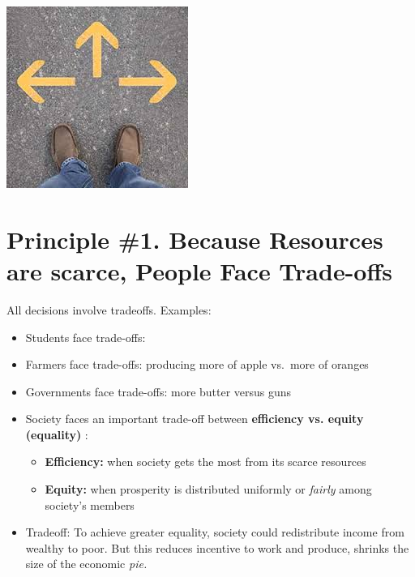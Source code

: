 \documentclass[
]{book}
\begin{document}
\includegraphics[width=\textwidth,height=0.6\textheight]{images/lesson01/fig1a.jpg}

\hypertarget{principle-1.-because-resources-are-scarce-people-face-trade-offs}{%
\section{Principle \#1. Because Resources are scarce, People Face Trade-offs}\label{principle-1.-because-resources-are-scarce-people-face-trade-offs}}

All decisions involve tradeoffs. Examples:

\begin{itemize}
\item
  Students face trade-offs:
\item
  Farmers face trade-offs: producing more of apple vs.~more of oranges
\item
  Governments face trade-offs: more butter versus guns
\item
  Society faces an important trade-off between \textbf{\color{blue} efficiency vs. equity (equality) }:

  \begin{itemize}
  \item
    \textbf{Efficiency:} when society gets the most from its scarce resources
  \item
    \textbf{Equity:} when prosperity is distributed uniformly or \emph{fairly} among society's members
  \end{itemize}
\item
  Tradeoff: To achieve greater equality, society could redistribute income from wealthy to poor. But this reduces incentive to work and produce, shrinks the size of the economic \emph{pie.}
\end{itemize}
\end{document}

